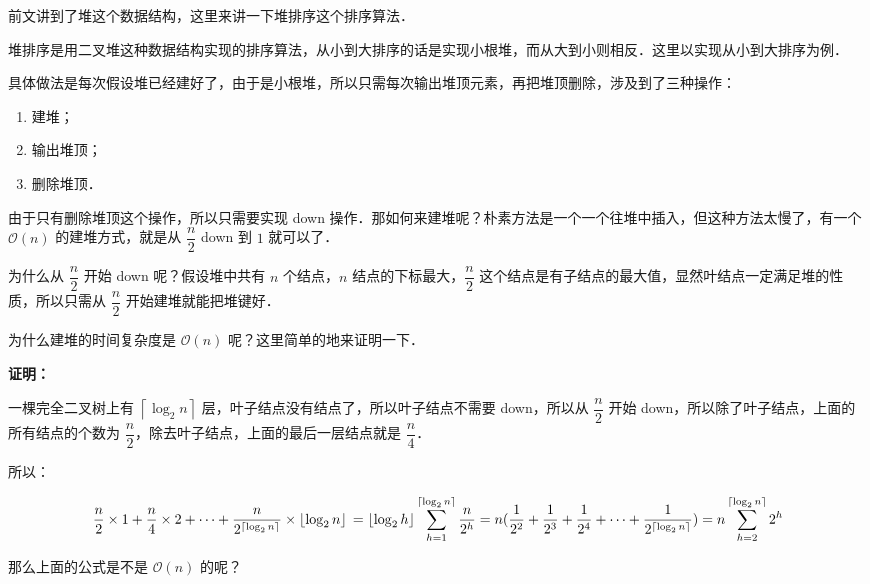 
前文讲到了堆这个数据结构，这里来讲一下堆排序这个排序算法．

堆排序是用二叉堆这种数据结构实现的排序算法，从小到大排序的话是实现小根堆，而从大到小则相反．这里以实现从小到大排序为例．

具体做法是每次假设堆已经建好了，由于是小根堆，所以只需每次输出堆顶元素，再把堆顶删除，涉及到了三种操作：

\begin{enumerate}
\item 建堆；
\item 输出堆顶；
\item 删除堆顶．
\end{enumerate}

由于只有删除堆顶这个操作，所以只需要实现 down 操作．那如何来建堆呢？朴素方法是一个一个往堆中插入，但这种方法太慢了，有一个 $\mathcal{O}(n)$ 的建堆方式，就是从 $\dfrac{n}{2}$ down 到 $1$ 就可以了． 

为什么从 $\dfrac{n}{2}$ 开始 down 呢？假设堆中共有 $n$ 个结点，$n$ 结点的下标最大，$\dfrac{n}{2}$ 这个结点是有子结点的最大值，显然叶结点一定满足堆的性质，所以只需从 $\dfrac{n}{2}$ 开始建堆就能把堆键好．

为什么建堆的时间复杂度是 $\mathcal{O}(n)$ 呢？这里简单的地来证明一下．

\textbf{证明：}

一棵完全二叉树上有 $\left\lceil{\log_2 n}\right\rceil$ 层，叶子结点没有结点了，所以叶子结点不需要 down，所以从 $\dfrac{n}{2}$ 开始 down，所以除了叶子结点，上面的所有结点的个数为 $\dfrac{n}{2}$，除去叶子结点，上面的最后一层结点就是 $\dfrac{n}{4}$．

所以：

\begin{equation}
\dfrac{n}{2} \times 1 + \dfrac{n}{4} \times 2 + \cdots + \dfrac{n}{2^{\left\lceil{\log_2 n}\right\rceil}} \times \left\lfloor{\log_2 n}\right\rfloor \\
= \left\lfloor{\log_2 h}\right\rfloor \sum ^ {\left\lceil{\log_2 n}\right\rceil} _ {h=1} \dfrac{n}{2^h} \\
= n(\dfrac{1}{2^2} + \dfrac{1}{2^3} + \dfrac{1}{2^4} + \cdots +\dfrac{1}{2^{\left\lceil{\log_2 n}\right\rceil}}) \\
= n \sum^{\left\lceil{\log_2 n}\right\rceil} _ {h = 2} 2^h\\
\end{equation}

那么上面的公式是不是 $\mathcal{O}(n)$ 的呢？

